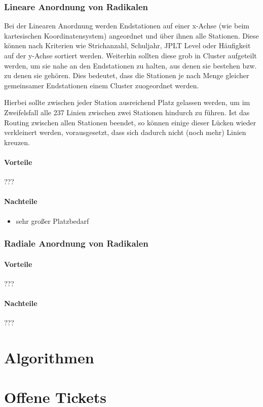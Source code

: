 \documentclass[color,german]{tudbook}
\begin{document}
\subsubsection{Lineare Anordnung von Radikalen}
Bei der Linearen Anordnung werden Endstationen auf einer x-Achse (wie beim kartesischen Koordinatensystem) angeordnet und über ihnen alle Stationen. Diese können nach Kriterien wie Strichanzahl, Schuljahr, JPLT Level oder Häufigkeit auf der y-Achse sortiert werden. Weiterhin sollten diese grob in Cluster aufgeteilt werden, um sie nahe an den Endstationen zu halten, aus denen sie bestehen bzw. zu denen sie gehören. Dies bedeutet, dass die Stationen je nach Menge gleicher gemeinsamer Endstationen einem Cluster zuogeordnet werden.

Hierbei sollte zwischen jeder Station ausreichend Platz gelassen werden, um im Zweifelsfall alle 237 Linien zwischen zwei Stationen hindurch zu führen. Ist das Routing zwischen allen Stationen beendet, so können einige dieser Lücken wieder verkleinert werden, vorausgesetzt, dass sich dadurch nicht (noch mehr) Linien kreuzen. 

\paragraph{Vorteile}
???

\paragraph{Nachteile}
\begin{itemize}
\item sehr großer Platzbedarf
\end{itemize}

\subsubsection{Radiale Anordnung von Radikalen}

\paragraph{Vorteile}
???

\paragraph{Nachteile}
???


\section{Algorithmen}

\section{Offene Tickets}

\end{document}
